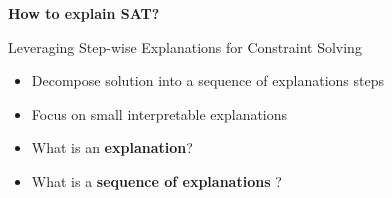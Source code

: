 \documentclass{beamer}
\renewcommand\emph[1]{{\color{vuborange}#1}}
\begin{document}
\begin{frame}
\begin{minipage}{0.63\textwidth}
		\end{minipage}
		
	\end{frame}
	
		\begin{frame}
		
			\textbf{How to  explain SAT?}	\pause
			\begin{center}
				\Large 
				Leveraging \emph{Step-wise Explanations} for Constraint Solving
			\end{center}\pause

			\begin{itemize}
				\item Decompose solution into a \emph{sequence} of explanations steps
				\item Focus on small \emph{interpretable} explanations
			\end{itemize}

		
	\end{frame}
	
	
	\begin{frame}
		\begin{itemize}
			\item What is an \textbf{\emph{explanation}}? \pause
			\item What is a \textbf{\emph{sequence of explanations}} ?
		\end{itemize}
	\end{frame}
%	
\end{document}
